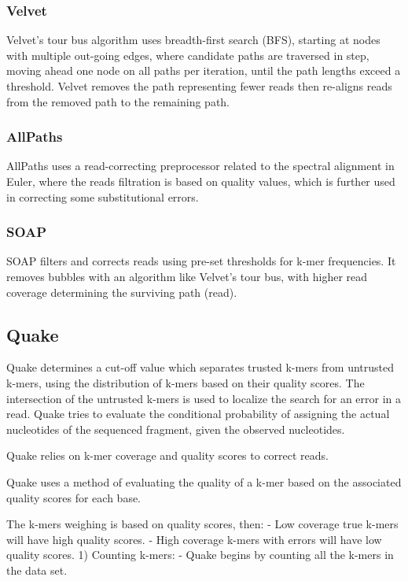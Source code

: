 \documentclass{llncs}
\begin{document}
\subsubsection{Velvet}
Velvet's \cite{Velvet} tour bus algorithm uses breadth-first search (BFS), starting at nodes with multiple out-going edges, where candidate paths are traversed in step, moving ahead one node on all paths per iteration, until the path lengths exceed a threshold. Velvet removes the path representing fewer reads then re-aligns reads from the removed path to the remaining path.

\subsubsection{AllPaths}
AllPaths \cite{AllPaths} uses a read-correcting preprocessor related to the spectral alignment in Euler, where the reads filtration is based on quality values, which is further used in correcting some substitutional errors. 

\subsubsection{SOAP}
SOAP \cite{Soap} filters and corrects reads using pre-set thresholds for k-mer frequencies. It removes bubbles with an algorithm like Velvet's tour bus, with higher read coverage determining the surviving path (read).

\subsection{Quake}
Quake \cite{Quake} determines a cut-off value which separates trusted k-mers from untrusted k-mers, using the distribution of k-mers based on their quality scores. The intersection of the untrusted k-mers is used to localize the search for an error in a read. Quake tries to evaluate the conditional probability of assigning the actual nucleotides of the sequenced fragment, given the observed nucleotides.

Quake relies on k-mer coverage and quality scores to correct reads. 

Quake uses a method of evaluating the quality of a k-mer based on the associated quality scores for each base. 

The k-mers weighing is based on quality scores, then:
- Low coverage true k-mers will have high quality scores.
- High coverage k-mers with errors will have low quality scores.
1) Counting k-mers:
- Quake begins by counting all the k-mers in the data set.
\end{document}
